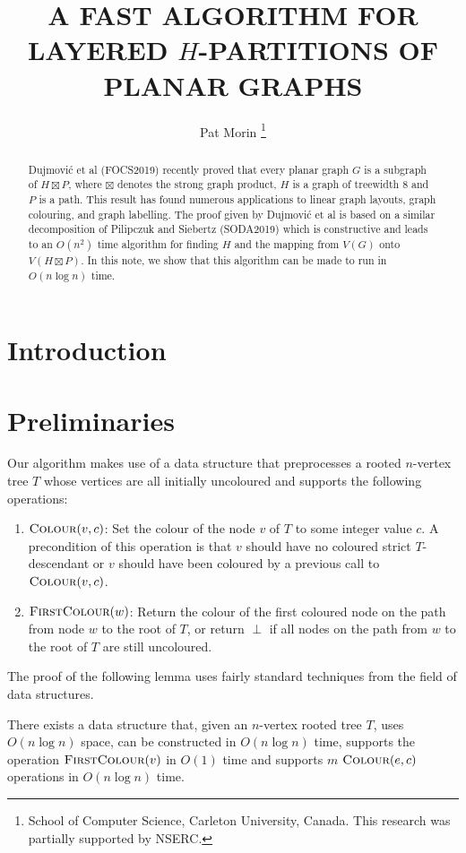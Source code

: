 \documentclass[kpfonts]{patmorin}
\title{\MakeUppercase{A Fast Algorithm for Layered $H$-Partitions of Planar Graphs}}
\author{
  Pat Morin%
    \thanks{School of Computer Science, Carleton University, Canada. This research was partially supported by NSERC.}
}
\begin{document}
\maketitle

\begin{abstract}
  Dujmović et al (FOCS2019) recently proved that every planar graph $G$ is a subgraph of $H\boxtimes P$, where $\boxtimes$ denotes the strong graph product, $H$ is a graph of treewidth 8 and $P$ is a path.  This result has found numerous applications to linear graph layouts, graph colouring, and graph labelling.  The proof given by Dujmović et al is based on a similar decomposition of Pilipczuk and Siebertz (SODA2019) which is constructive and leads to an $O(n^2)$ time algorithm for finding $H$ and the mapping from $V(G)$ onto $V(H\boxtimes P)$.  In this note, we show that this algorithm can be made to run in $O(n\log n)$ time.
\end{abstract}

\section{Introduction}

\section{Preliminaries}

Our algorithm makes use of a data structure that preprocesses a rooted $n$-vertex tree $T$ whose vertices are all initially uncoloured and supports the following operations:
\begin{enumerate}
  \item $\textsc{Colour}(v,c)$: Set the colour of the node $v$ of $T$ to some integer value $c$.  A precondition of this operation is that $v$ should have no coloured strict $T$-descendant or $v$ should have been coloured by a previous call to $\textsc{Colour}(v,c)$.
  
  \item $\textsc{FirstColour}(w)$: Return the colour of the first coloured node on the path from node $w$ to the root of $T$, or return $\perp$ if all nodes on the path from $w$ to the root of $T$ are still uncoloured.
\end{enumerate}

The proof of the following lemma uses fairly standard techniques from the field of data structures.

\begin{lem}
  There exists a data structure that, given an $n$-vertex rooted tree $T$, uses $O(n\log n)$ space, can be constructed in $O(n\log n)$ time, supports the operation $\textsc{FirstColour}(v)$ in $O(1)$ time and supports $m$ $\textsc{Colour}(e,c)$ operations in $O(n\log n)$ time.
\end{lem}
\end{document}
